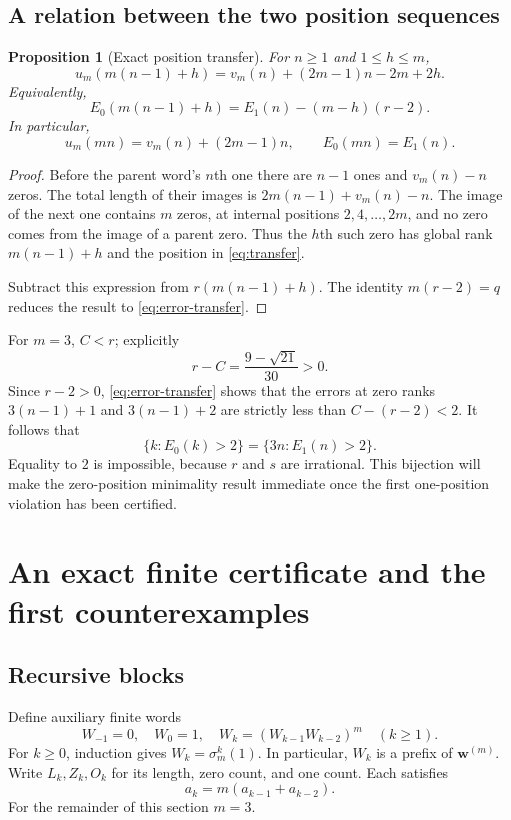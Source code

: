 \documentclass[11pt]{article}
\numberwithin{equation}{section}
\newtheorem{proposition}[theorem]{Proposition}
\theoremstyle{definition}
\theoremstyle{remark}
\newcommand{\word}{\mathbf{w}}
\begin{document}
\subsection{A relation between the two position sequences}
\begin{proposition}[Exact position transfer]\label{prop:transfer}
For $n\ge1$ and $1\le h\le m$,
\begin{equation}\label{eq:transfer}
u_m(m(n-1)+h)=v_m(n)+(2m-1)n-2m+2h.
\end{equation}
Equivalently,
\begin{equation}\label{eq:error-transfer}
E_0(m(n-1)+h)=E_1(n)-(m-h)(r-2).
\end{equation}
In particular,
\begin{equation}\label{eq:mn}
u_m(mn)=v_m(n)+(2m-1)n,\qquad E_0(mn)=E_1(n).
\end{equation}
\end{proposition}
\begin{proof}
Before the parent word's $n$th one there are $n-1$ ones and
$v_m(n)-n$ zeros. The total length of their images is
$2m(n-1)+v_m(n)-n$. The image of the next one contains $m$ zeros, at
internal positions $2,4,\ldots,2m$, and no zero comes from the image of a
parent zero. Thus the $h$th such zero has global rank $m(n-1)+h$ and the
position in \eqref{eq:transfer}.

Subtract this expression from $r(m(n-1)+h)$. The identity
$m(r-2)=q$ reduces the result to \eqref{eq:error-transfer}.
\end{proof}

For $m=3$, $C<r$; explicitly
\[
r-C=\frac{9-\sqrt{21}}{30}>0.
\]
Since $r-2>0$, \eqref{eq:error-transfer} shows that the errors at
zero ranks $3(n-1)+1$ and $3(n-1)+2$ are strictly less than
$C-(r-2)<2$. It follows that
\begin{equation}\label{eq:violations-bijection}
\{k:E_0(k)>2\}=\{3n:E_1(n)>2\}.
\end{equation}
Equality to $2$ is impossible, because $r$ and $s$ are irrational.
This bijection will make the zero-position minimality result immediate
once the first one-position violation has been certified.

\section{An exact finite certificate and the first counterexamples}\label{sec:certificate}

\subsection{Recursive blocks}
Define auxiliary finite words
\begin{equation}\label{eq:blocks}
W_{-1}=0,\quad W_0=1,\quad
W_k=(W_{k-1}W_{k-2})^m\quad(k\ge1).
\end{equation}
For $k\ge0$, induction gives $W_k=\sigma_m^k(1)$. In particular,
$W_k$ is a prefix of $\word^{(m)}$. Write $L_k,Z_k,O_k$ for its length,
zero count, and one count. Each satisfies
\begin{equation}\label{eq:block-recurrence}
a_k=m(a_{k-1}+a_{k-2}).
\end{equation}
For the remainder of this section $m=3$.
\end{document}
